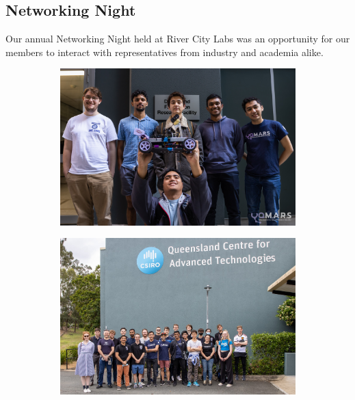\documentclass[a4paper,12pt]{report}
\begin{document}
\subsection{Networking Night} 
Our annual Networking Night held at River City Labs was an opportunity for our members to interact with representatives from industry and academia alike.
\begin{figure}[H]
    \centering
    \begin{subfigure}{0.42\linewidth}
        \includegraphics[width=0.99\linewidth]{prospectus/2023/Photos/DRC.jpg}
    \end{subfigure}
    \begin{subfigure}{0.42\linewidth}
        \includegraphics[width=0.99\linewidth]{prospectus/2023/Photos/CSIRO.jpg}
    \end{subfigure}
\end{figure}
\newpage
\end{document}
